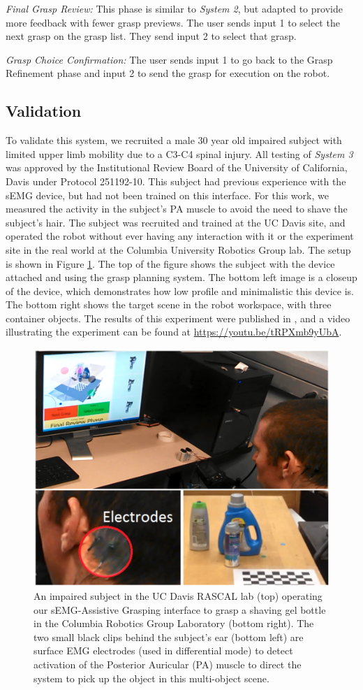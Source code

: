 \emph{Final Grasp Review:} This phase is similar to \emph{System 2}, but adapted to provide more feedback with fewer grasp previews. The user sends input 1 to select the next grasp on the grasp list. They send input 2 to select that grasp. 

\emph{Grasp Choice Confirmation:} The user sends input 1 to go back to the Grasp Refinement phase and input 2 to send the grasp for execution on the robot.


\subsection{Validation}
To validate this system, we recruited a male 30 year old impaired subject with limited upper limb mobility due to a C3-C4 spinal injury. All testing of \emph{System 3} was approved by the Institutional Review Board of the University of California, Davis under Protocol 251192-10. This subject had previous experience with the sEMG device, but had not been trained on this interface. For this work, we measured the activity in the subject's PA muscle to avoid the need to shave the subject's hair. The subject was recruited and trained at the UC Davis site, and operated the robot without ever having any interaction with it or the experiment site in the real world at the Columbia University Robotics Group lab. The setup is shown in Figure \ref{fig:user-semg}. The top of the figure shows the subject with the device attached and using the grasp planning system. The bottom left image is a closeup of the device, which demonstrates how low profile and minimalistic this device is. The bottom right shows the target scene in the robot workspace, with three container objects. The results of this experiment were published in \cite{Weisz2014}, and a video illustrating the experiment can be found at \url{https://youtu.be/tRPXmb9yUbA}.
\begin{figure}
\centering
\includegraphics[width=.8\columnwidth]{user_semg.png}
\caption{An impaired subject in the UC Davis RASCAL
lab (top) operating our sEMG-Assistive Grasping interface
to grasp a shaving gel bottle in the Columbia Robotics
Group Laboratory (bottom right). The two small black clips
behind the subject’s ear (bottom left) are surface EMG
electrodes (used in differential mode) to detect activation of
the Posterior Auricular (PA) muscle to direct the system to
pick up the object in this multi-object scene.}
\label{fig:user-semg}
\end{figure}


